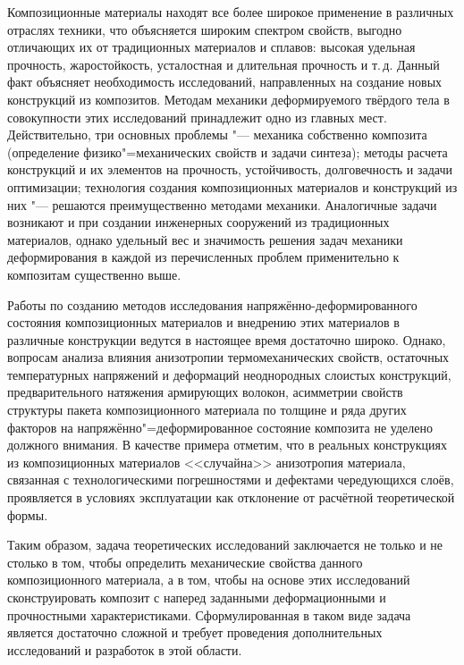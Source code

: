 {
\small

Композиционные материалы  находят все более широкое применение в различных отраслях техники, что объясняется широким спектром свойств, выгодно отличающих их от традиционных материалов и сплавов: высокая удельная прочность, жаростойкость, усталостная и длительная прочность и т.\,д.
Данный факт объясняет необходимость исследований, направленных на создание новых конструкций из композитов. Методам механики деформируемого твёрдого тела в совокупности этих исследований принадлежит одно из главных мест. Действительно, три основных проблемы "--- механика собственно композита (определение физико"=механических свойств и задачи синтеза); методы расчета конструкций и их элементов на прочность, устойчивость, долговечность и задачи оптимизации; технология создания композиционных материалов и конструкций из них "--- решаются преимущественно методами механики. 
Аналогичные задачи возникают и при создании инженерных сооружений из традиционных материалов, однако удельный вес и значимость решения задач механики деформирования в каждой из перечисленных проблем применительно к композитам существенно выше.

Работы по созданию методов исследования напряжённо-деформированного состояния композиционных материалов и внедрению этих материалов в различные конструкции ведутся в настоящее время достаточно широко. Однако, вопросам анализа влияния анизотропии термомеханических свойств, остаточных температурных напряжений и деформаций неоднородных слоистых конструкций, предварительного натяжения армирующих волокон, асимметрии свойств структуры пакета композиционного материала по толщине и ряда других факторов на напряжённо"=деформированное состояние композита не уделено должного внимания. В качестве примера отметим, что в реальных конструкциях из композиционных материалов <<случайна>> анизотропия материала, связанная с технологическими погрешностями и дефектами чередующихся слоёв, проявляется в условиях эксплуатации как отклонение от расчётной теоретической формы.

Таким образом, задача теоретических исследований заключается не только и не столько в том, чтобы определить механические свойства данного композиционного материала, а в том, чтобы на основе этих исследований сконструировать композит с наперед заданными деформационными и прочностными характеристиками. Сформулированная в таком виде задача является достаточно сложной и требует проведения дополнительных исследований и разработок в этой области.

}
